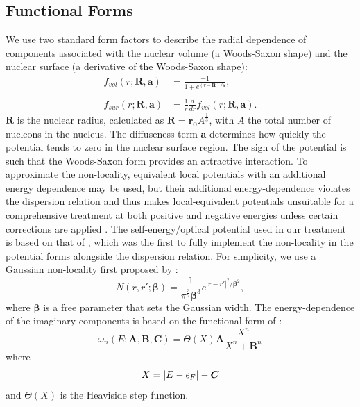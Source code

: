 \subsection{Functional Forms}
We use two standard form factors
to describe the radial dependence of components
associated with the nuclear volume (a Woods-Saxon shape)
and the nuclear surface (a derivative of the Woods-Saxon shape):
\begin{equation} \label{WoodsSaxon}
    \begin{split}
        f_{vol}(r; \bm{R}, \bm{a}) & = \frac{-1}{1+e^{(r-\bm{R})/\bm{a}}},\\
        \\
        f_{sur}(r; \bm{R}, \bm{a}) & = \frac{1}{r}\frac{d}{dr}f_{vol}(r; \bm{R},
        \bm{a}).
    \end{split}
\end{equation}
$\bm{R}$ is the nuclear radius, calculated as $\bm{R} = \bm{r_{0}}A^{\frac{1}{3}}$, with $A$ the total number of
nucleons in the nucleus. The diffuseness term $\bm{a}$ determines how quickly the potential tends to
zero in the nuclear surface region.
The sign of the potential is such that the Woods-Saxon form
provides an attractive interaction.
To approximate the non-locality, equivalent local potentials \cite{Mahaux1991}
with an additional energy dependence may be used, but their additional energy-dependence
violates the dispersion relation and thus makes local-equivalent potentials unsuitable
for a comprehensive treatment at both positive and negative energies unless
certain corrections are applied \cite{Mahaux1991}.
The self-energy/optical potential used in our treatment is based on that of
\cite{MahzoonPhDThesis}, which was the first to fully implement the non-locality in the potential
forms alongside the dispersion relation. For simplicity, we use a Gaussian
non-locality first proposed by \cite{Perey1962}:
\begin{equation}
    N(r, r';\bm{\beta}) = \frac{1}{\pi^{\frac{3}{2}}\bm{\beta}^{3}}
    e^{|r-r'|^{2}/{\bm{\beta}^{2}}},
\end{equation}
where $\bm{\beta}$ is a free parameter that sets the Gaussian width. The energy-dependence of the
imaginary components is based on the functional form of \cite{Charity2006}:
\begin{equation} \label{omega}
    \omega_{n}(E; \bm{A}, \bm{B}, \bm{C}) = \Theta(X)\bm{A}\frac{X^{n}}{X^{n}+\bm{B}^{n}}
\end{equation}
where
\begin{equation*}
    X = |E-\epsilon_{F}|-\bm{C}\\
\end{equation*}
and $\Theta(X)$ is the Heaviside step function. 

